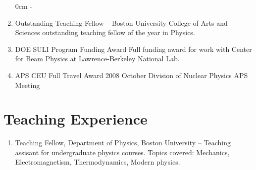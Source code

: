 \begin{enumerate}
 0cm \linewidth \listindent \dimexpr\linewidth-\listindent\relax
\item[] Outstanding Teaching Fellow \hfill {} --  \newline
Boston University College of Arts and Sciences outstanding teaching fellow of the year in Physics.


\item[] DOE SULI Program Funding Award \hfill {}\newline
{Full funding award for work with Center for Beam Physics at Lawrence-Berkeley National Lab.
}


\item[] APS CEU Full Travel Award \hfill {} \newline
{2008 October Division of Nuclear Physics APS Meeting}


\end{enumerate}


\section*{Teaching Experience}

\begin{enumerate}
 0cm \linewidth \listindent \dimexpr\linewidth-\listindent\relax
\item[] Teaching Fellow, Department of Physics, Boston University \hfill {} -- \newline
{Teaching assisant for undergraduate physics courses.  Topics covered: Mechanics, Electromagnetism, Thermodynamics, Modern physics.}

\end{enumerate}



